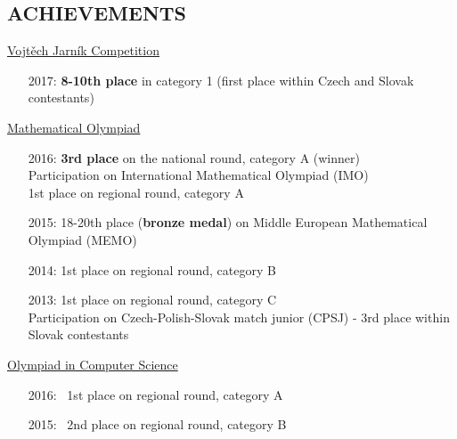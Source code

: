 \documentclass[margin, 10pt]{res} %
\begin{document}
\begin{resume}
\section{ACHIEVEMENTS}
\href{http://vjimc.osu.cz/j27/j27results1.html}{Vojtěch Jarník Competition}
\begin{itemize} \itemsep -2pt %
\item[2017:] \textbf{8-10th place} in category 1 (first place within Czech and Slovak contestants)
\end{itemize}

\href{https://skmo.sk/poradia.php?podlink=ucastnici&uid=7082}{ Mathematical Olympiad}
\begin{itemize} \itemsep -2pt %
\item[2016:] 
\textbf{3rd place} on the national round, category A (winner) \\
Participation on International Mathematical Olympiad (IMO) \\
1st place on regional round, category A
\item[2015:]  18-20th place (\textbf{bronze medal}) on Middle European Mathematical Olympiad (MEMO)
\item[2014:]  1st place on regional round, category B
\item[2013:]  1st place on regional round, category C \\
Participation on Czech-Polish-Slovak match junior (CPSJ) - 3rd place within Slovak contestants
\end{itemize}
\href{http://oi.sk/archive.php}{Olympiad in Computer Science}
\begin{itemize} \itemsep -2pt %
\item[2016:] \ 1st place on regional round, category A
\item[2015:] \ 2nd place on regional round, category B
\end{itemize}


 

\end{resume}
\end{document}
